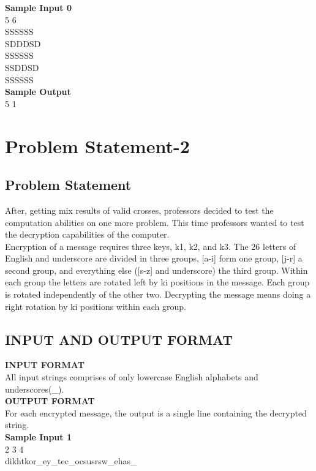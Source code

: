 \documentclass[a4paper,12pt]{article}
\begin{document}
{   \textbf{Sample Input 0}\\
   5 6\\
SSSSSS\\
SDDDSD\\
SSSSSS\\
SSDDSD\\
SSSSSS\\

\textbf{Sample Output}\\
5 1
\newpage
\section{\large{Problem Statement-2}} 
\subsection{Problem Statement}
\begin{flushleft}
After, getting mix results of valid crosses, professors decided to test the computation abilities on one more problem. This time professors wanted to test the decryption capabilities of the computer.\\
Encryption of  a message requires three keys, k1, k2, and k3. The 26 letters of English and underscore are divided in three groups,  [a-i] form one group, [j-r] a second group, and everything else ([s-z] and underscore) the third group. Within each group the letters are rotated left by ki positions in the message. Each group is rotated independently of the other two. Decrypting the message means doing a right rotation by ki positions within each group.\\
\end{flushleft}
\subsection{INPUT AND OUTPUT FORMAT}
\textbf{INPUT FORMAT}\\
 All input strings comprises of only lowercase English alphabets and underscores(\_).\\
\textbf{OUTPUT FORMAT}\\
 For each encrypted message, the output is a single line containing the decrypted string.\\
   
   \textbf{Sample Input 1}\\
   2 3 4\\
   dikhtkor\_ey\_tec\_ocsusrsw\_ehas\_
   \\
   
}
\end{document}
